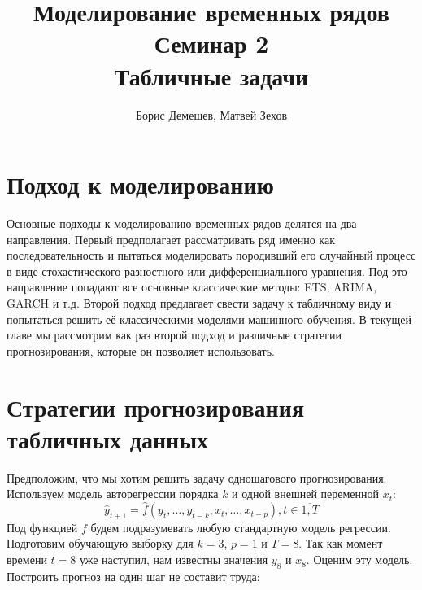 \documentclass[12pt,fleqn]{article}
\begin{document}
\title{Моделирование временных рядов\\Семинар 2\\Табличные задачи}
\author{Борис Демешев, Матвей Зехов}
\date{}
\maketitle

\section{Подход к моделированию}

Основные подходы к моделированию временных рядов делятся на два направления. Первый предполагает рассматривать ряд именно как последовательность и пытаться моделировать породивший его случайный процесс в виде стохастического разностного или дифференциального уравнения. Под это направление попадают все основные классические методы: ETS, ARIMA, GARCH и т.д. Второй подход предлагает свести задачу к табличному виду и попытаться решить её классическими моделями машинного обучения. В текущей главе мы рассмотрим как раз второй подход и различные стратегии прогнозирования, которые он позволяет использовать.

\section{Стратегии прогнозирования табличных данных}

Предположим, что мы хотим решить задачу одношагового прогнозирования. Используем модель авторегрессии порядка $k$ и одной внешней переменной $x_t$:  $$\hat{y}_{t+1} = \hat{f}(y_t, \ldots, y_{t-k}, x_{t}, \ldots, x_{t-p}), t \in \overline{1, T}$$ Под функцией $f$ будем подразумевать любую стандартную модель регрессии. Подготовим обучающую выборку для $k=3$, $p=1$ и $T=8$. Так как момент времени $t=8$ уже наступил, нам известны значения $y_8$ и $x_8$. Оценим эту модель. Построить прогноз на один шаг не составит труда:
\end{document}
